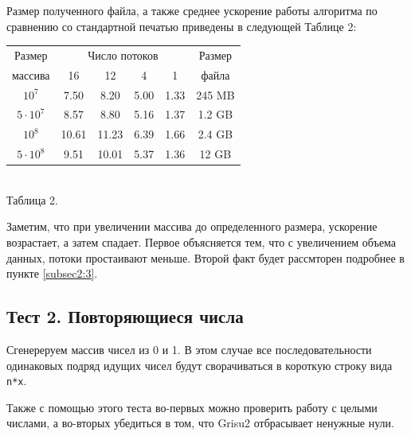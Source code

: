 Размер полученного файла, а также среднее ускорение работы алгоритма по сравнению со стандартной печатью приведены в следующей Таблице 2:
\begin{center}
\begin{tabular}{||c|c|c|c|c|c||}
\hline
\hline
Размер & \multicolumn{4}{c|}{Число потоков} & Размер\\
\hhline{~|-|-|-|-|~|}
массива & 16 & 12 & 4 & 1 & файла \\
\hline
$10^7$ & 7.50 & 8.20 & 5.00 & 1.33 & 245 MB \\
\hline
$5 \cdot 10^7$ & 8.57 & 8.80 & 5.16 & 1.37 & 1.2 GB \\
\hline
$10^8$ & 10.61 & 11.23 & 6.39 & 1.66 & 2.4 GB\\
\hline
$5 \cdot 10^8$ & 9.51 & 10.01 & 5.37 & 1.36 & 12 GB \\
\hline
\hline
\end{tabular}
\\\vspace{10pt}
\small{Таблица 2.}
\end{center}

Заметим, что при увеличении массива до определенного размера, ускорение возрастает, а затем спадает.
Первое объясняется тем, что с увеличением объема данных, потоки простаивают меньше.
Второй факт будет рассмторен подробнее в пункте \ref{subsec2:3}.

\subsection{Тест 2. Повторяющиеся числа}
Сгенереруем массив чисел из 0 и 1.
В этом случае все последовательности одинаковых подряд идущих чисел будут сворачиваться в короткую строку вида \texttt{n*x}.

Также с помощью этого теста во-первых можно проверить работу с целыми числами, а во-вторых убедиться в том, что \textsf{Grisu2} отбрасывает ненужные нули.

